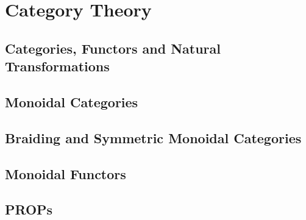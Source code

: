 \section{Category Theory}

\subsection{Categories, Functors and Natural Transformations}
\subsection{Monoidal Categories}
\subsection{Braiding and Symmetric Monoidal Categories}
\subsection{Monoidal Functors}
\subsection{PROPs}

